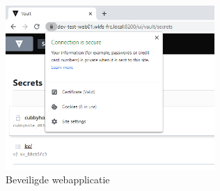 \begin{figure}[htbp]
\centerline{\includegraphics[width=300]{bachproef/img/poc/secure.png}}
\caption{Beveiligde webapplicatie \autocite{vault}}
\label{fig:secure}
\end{figure}
\newpage


